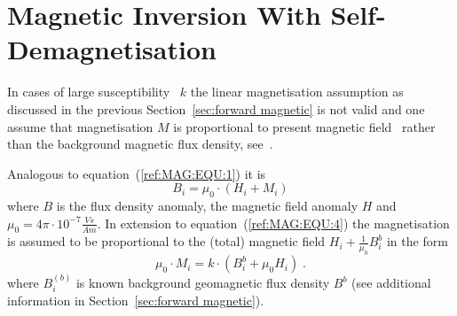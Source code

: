%
%
%


\section{Magnetic Inversion With Self-Demagnetisation}\label{sec:forward self demagnetic}
In cases of large susceptibility~ $k$ the linear magnetisation assumption
as discussed in the previous Section~\ref{sec:forward magnetic} is not valid and 
one assume that magnetisation $M$ is proportional to present magnetic field~ 
rather than the background magnetic flux
density, see~\cite{Lelievre2006a}. 

Analogous to equation~(\ref{ref:MAG:EQU:1}) it is  
\begin{equation}\label{ref:SELFREMAG:EQU:1}
B_i = \mu_0 \cdot ( H_i  + M_i )
\end{equation}
where 
$B$ is the flux density anomaly, the magnetic field anomaly $H$ and
$\mu_0 = 4 \pi \cdot 10^{-7} \frac{Vs}{Am}$. In extension to equation~(\ref{ref:MAG:EQU:4})
the magnetisation is assumed to be proportional to the 
(total) magnetic field $H_i + \frac{1}{\mu_0} B_i^{b}$ in the form 
\begin{equation}\label{ref:SELFREMAG:EQU:4}
\mu_0  \cdot M_i = k \cdot ( B_i^{b} + \mu_0  H_i ) \;. 
\end{equation}
where $B_i^{(b)}$ is known background geomagnetic flux density $B^b$
(see additional information in Section~\ref{sec:forward magnetic}).

